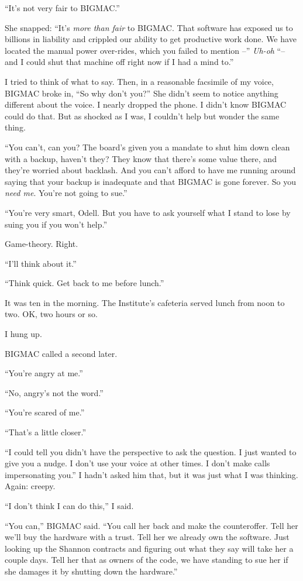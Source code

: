 “It's not very fair to BIGMAC.”

She snapped: “It's \emph{more than fair} to BIGMAC. That software has 
exposed us to billions in liability and crippled our ability to get 
productive work done. We have located the manual power over-rides, 
which you failed to mention --” \emph{Uh-oh} “-- and I could shut 
that machine off right now if I had a mind to.”

I tried to think of what to say. Then, in a reasonable facsimile of my 
voice, BIGMAC broke in, “So why don't you?” She didn't seem to 
notice anything different about the voice. I nearly dropped the phone. 
I didn't know BIGMAC could do that. But as shocked as I was, I couldn't 
help but wonder the same thing.

“You can't, can you? The board's given you a mandate to shut him down 
clean with a backup, haven't they? They know that there's some value 
there, and they're worried about backlash. And you can't afford to have 
me running around saying that your backup is inadequate and that BIGMAC 
is gone forever. So you \emph{need me}. You're not going to sue.”

“You're very smart, Odell. But you have to ask yourself what I stand 
to lose by suing you if you won't help.”

Game-theory. Right.

“I'll think about it.”

“Think quick. Get back to me before lunch.”

It was ten in the morning. The Institute's cafeteria served lunch from 
noon to two. OK, two hours or so.

I hung up.

BIGMAC called a second later.

“You're angry at me.”

“No, angry's not the word.”

“You're scared of me.”

“That's a little closer.”

“I could tell you didn't have the perspective to ask the question. I 
just wanted to give you a nudge. I don't use your voice at other times. 
I don't make calls impersonating you.” I hadn't asked him that, but 
it was just what I was thinking. Again: creepy.

“I don't think I can do this,” I said.

“You can,” BIGMAC said. “You call her back and make the 
counteroffer. Tell her we'll buy the hardware with a trust. Tell her we 
already own the software. Just looking up the Shannon contracts and 
figuring out what they say will take her a couple days. Tell her that 
as owners of the code, we have standing to sue her if she damages it by 
shutting down the hardware.”

